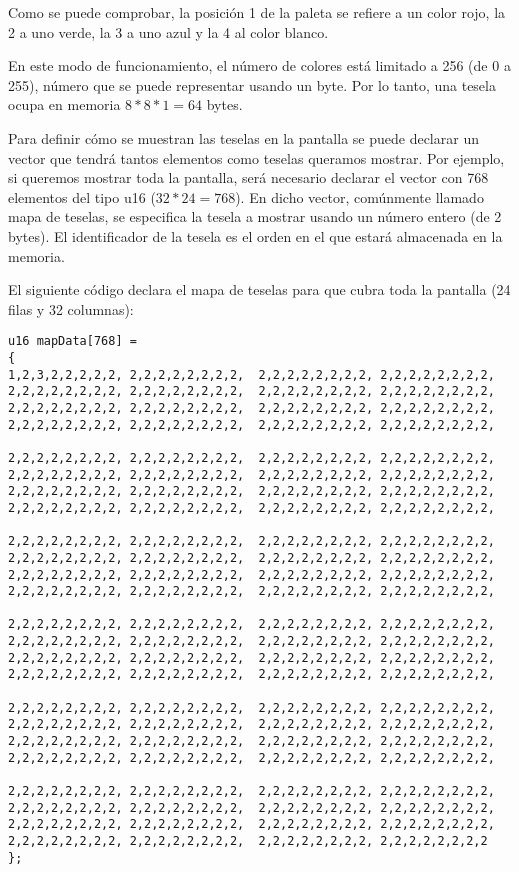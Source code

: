 Como se puede comprobar, la posición 1 de la paleta se refiere a un color rojo, la 2 a uno verde, la 3 a uno azul y la 4 al color blanco.

En este modo de funcionamiento, el número de colores está limitado a 256 (de 0 a 255), número que se puede representar usando un byte. Por lo tanto, una tesela ocupa en memoria $8*8*1=64$ bytes. 

Para definir cómo se muestran las teselas en la pantalla se puede declarar un vector que tendrá tantos elementos como teselas queramos mostrar. Por ejemplo, si queremos mostrar toda la pantalla, será necesario declarar el vector con 768 elementos del tipo u16 ($32*24=768$). En dicho vector, comúnmente llamado mapa de teselas, se especifica la tesela a mostrar usando un número entero (de 2 bytes). El identificador de la tesela es el orden en el que estará almacenada en la memoria. 

\begin{example}
El siguiente código declara el mapa de teselas para que cubra toda la pantalla (24 filas y 32 columnas):

\begin{lstlisting}
u16 mapData[768] =
{
1,2,3,2,2,2,2,2, 2,2,2,2,2,2,2,2,  2,2,2,2,2,2,2,2, 2,2,2,2,2,2,2,2,
2,2,2,2,2,2,2,2, 2,2,2,2,2,2,2,2,  2,2,2,2,2,2,2,2, 2,2,2,2,2,2,2,2,
2,2,2,2,2,2,2,2, 2,2,2,2,2,2,2,2,  2,2,2,2,2,2,2,2, 2,2,2,2,2,2,2,2,
2,2,2,2,2,2,2,2, 2,2,2,2,2,2,2,2,  2,2,2,2,2,2,2,2, 2,2,2,2,2,2,2,2,

2,2,2,2,2,2,2,2, 2,2,2,2,2,2,2,2,  2,2,2,2,2,2,2,2, 2,2,2,2,2,2,2,2,
2,2,2,2,2,2,2,2, 2,2,2,2,2,2,2,2,  2,2,2,2,2,2,2,2, 2,2,2,2,2,2,2,2,
2,2,2,2,2,2,2,2, 2,2,2,2,2,2,2,2,  2,2,2,2,2,2,2,2, 2,2,2,2,2,2,2,2,
2,2,2,2,2,2,2,2, 2,2,2,2,2,2,2,2,  2,2,2,2,2,2,2,2, 2,2,2,2,2,2,2,2,

2,2,2,2,2,2,2,2, 2,2,2,2,2,2,2,2,  2,2,2,2,2,2,2,2, 2,2,2,2,2,2,2,2,
2,2,2,2,2,2,2,2, 2,2,2,2,2,2,2,2,  2,2,2,2,2,2,2,2, 2,2,2,2,2,2,2,2,
2,2,2,2,2,2,2,2, 2,2,2,2,2,2,2,2,  2,2,2,2,2,2,2,2, 2,2,2,2,2,2,2,2,
2,2,2,2,2,2,2,2, 2,2,2,2,2,2,2,2,  2,2,2,2,2,2,2,2, 2,2,2,2,2,2,2,2,

2,2,2,2,2,2,2,2, 2,2,2,2,2,2,2,2,  2,2,2,2,2,2,2,2, 2,2,2,2,2,2,2,2,
2,2,2,2,2,2,2,2, 2,2,2,2,2,2,2,2,  2,2,2,2,2,2,2,2, 2,2,2,2,2,2,2,2,
2,2,2,2,2,2,2,2, 2,2,2,2,2,2,2,2,  2,2,2,2,2,2,2,2, 2,2,2,2,2,2,2,2,
2,2,2,2,2,2,2,2, 2,2,2,2,2,2,2,2,  2,2,2,2,2,2,2,2, 2,2,2,2,2,2,2,2,

2,2,2,2,2,2,2,2, 2,2,2,2,2,2,2,2,  2,2,2,2,2,2,2,2, 2,2,2,2,2,2,2,2,
2,2,2,2,2,2,2,2, 2,2,2,2,2,2,2,2,  2,2,2,2,2,2,2,2, 2,2,2,2,2,2,2,2,
2,2,2,2,2,2,2,2, 2,2,2,2,2,2,2,2,  2,2,2,2,2,2,2,2, 2,2,2,2,2,2,2,2,
2,2,2,2,2,2,2,2, 2,2,2,2,2,2,2,2,  2,2,2,2,2,2,2,2, 2,2,2,2,2,2,2,2,

2,2,2,2,2,2,2,2, 2,2,2,2,2,2,2,2,  2,2,2,2,2,2,2,2, 2,2,2,2,2,2,2,2,
2,2,2,2,2,2,2,2, 2,2,2,2,2,2,2,2,  2,2,2,2,2,2,2,2, 2,2,2,2,2,2,2,2,
2,2,2,2,2,2,2,2, 2,2,2,2,2,2,2,2,  2,2,2,2,2,2,2,2, 2,2,2,2,2,2,2,2,
2,2,2,2,2,2,2,2, 2,2,2,2,2,2,2,2,  2,2,2,2,2,2,2,2, 2,2,2,2,2,2,2,2
};
\end{lstlisting}
\end{example}
	
